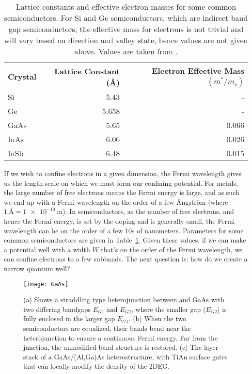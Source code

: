 \begin{table}
  \centering
  \begin{tabular}{@{}lrr@{}}
   \toprule
   Crystal & Lattice Constant (\si{\angstrom}) & Electron Effective Mass$(m^*/m_e)$ \\
   \midrule
   Si & 5.43 & - \\
   Ge & 5.658 & - \\
   GaAs & 5.65 & 0.066 \\
   InAs & 6.06 & 0.026 \\
   InSb & 6.48 & 0.015 \\
   \bottomrule
  \end{tabular}
  \caption[Properties of some common semiconductors]
  {Lattice constants and effective electron masses for some common semiconductors. For Si and Ge semiconductors, which are
  indirect band gap semiconductors, the effective mass for electrons is not trivial and will vary based
  on direction and valley state, hence values are not given above. Values are taken from \cite{Kittel2004,InSbParam}.}
  \label{tab:semiprop}
\end{table}

If we wish to confine electrons in a given dimension, the Fermi wavelength gives us the length-scale on which we must form
our confining potential. For metals, the large number of free electrons means the Fermi energy is large, and as such we end up with a
Fermi wavelength on the order of a few Ångström (where $\SI{1}{\angstrom} = \SI{1e-10}{\meter}$). In semiconductors, as
the number of free electrons, and hence the Fermi energy, is set by the doping and is generally small, the Fermi
wavelength can be on the order of a few 10s of nanometers. Parameters for some common semiconductors are given
in Table~\ref{tab:semiprop}. Given these values, if we can make a potential well with a width $W$ that's on
the order of the Fermi wavelength, we can confine electrons to a few subbands. The next question is: how
do we create a narrow quantum well?

\begin{figure}
  \texttt{[image: GaAs]}
  \caption[Band bending in a straddling type heterojunction, and the GaAs/AlGaAs heterostructure]
  {\label{fig:heterostructure}(a) Shows a straddling type heterojunction between  and GaAs with two
  differing bandgaps $E_{G1}$ and $E_{G2}$, where the smaller gap ($E_{G2}$) is fully enclosed in the larger gap $E_{G1}$.
  (b) When the two semiconductors are equalized, their bands bend near the heterojunction to ensure a continuous Fermi energy.
  Far from the junction, the unmodified band structure is restored. (c) The layer stack of a GaAs/(Al,Ga)As heterostructure,
  with TiAu surface gates that can locally modify the density of the 2DEG.}
\end{figure}

